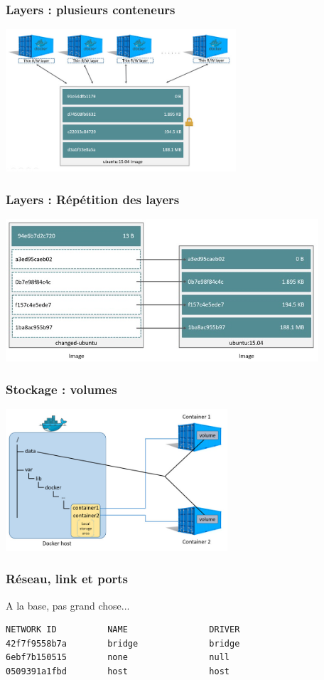  \begin{frame}
    \frametitle{Layers : plusieurs conteneurs}
    \includegraphics[height=200px]{images/docker/sharing-layers.jpg}
  \end{frame}

 \begin{frame}
    \frametitle{Layers : Répétition des layers}
    \includegraphics[height=200px]{images/docker/saving-space.jpg}
  \end{frame}

  \begin{frame}
    \frametitle{Stockage : volumes}
    \includegraphics[height=200px]{images/docker/shared-volume.jpg}
  \end{frame}

  \begin{frame}
    \frametitle{Réseau, link et ports}
    A la base, pas grand chose...
\begin{verbatim}
NETWORK ID          NAME                DRIVER
42f7f9558b7a        bridge              bridge
6ebf7b150515        none                null
0509391a1fbd        host                host
\end{verbatim}
  \end{frame}
